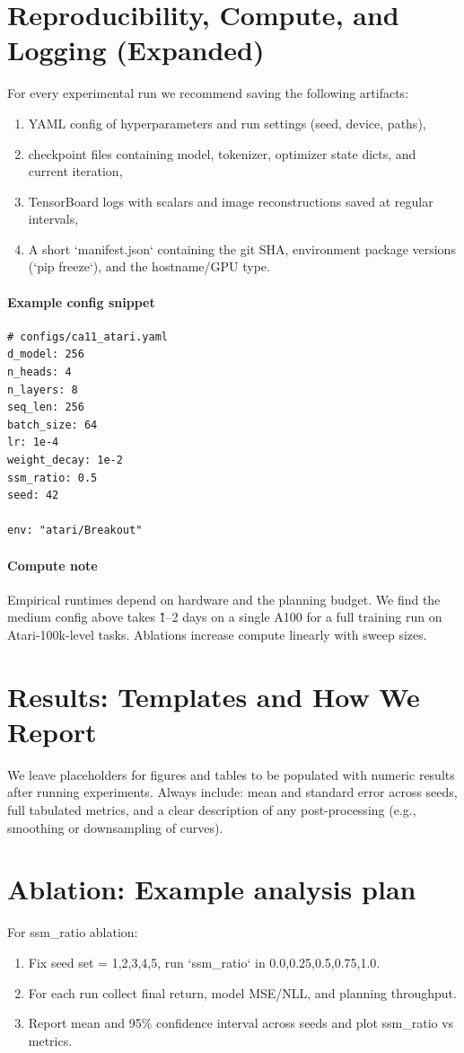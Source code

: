 \documentclass{article}
\begin{document}
\section{Reproducibility, Compute, and Logging (Expanded)}
For every experimental run we recommend saving the following artifacts:
\begin{enumerate}
  \item YAML config of hyperparameters and run settings (seed, device, paths),
  \item checkpoint files containing model, tokenizer, optimizer state dicts, and current iteration,
  \item TensorBoard logs with scalars and image reconstructions saved at regular intervals,
  \item A short `manifest.json` containing the git SHA, environment package versions (`pip freeze`), and the hostname/GPU type.
\end{enumerate}

\paragraph{Example config snippet}
\begin{verbatim}
# configs/ca11_atari.yaml
d_model: 256
n_heads: 4
n_layers: 8
seq_len: 256
batch_size: 64
lr: 1e-4
weight_decay: 1e-2
ssm_ratio: 0.5
seed: 42

env: "atari/Breakout"
\end{verbatim}

\paragraph{Compute note}
Empirical runtimes depend on hardware and the planning budget. We find the medium config above takes \~1–2 days on a single A100 for a full training run on Atari-100k-level tasks. Ablations increase compute linearly with sweep sizes.

\section{Results: Templates and How We Report}
We leave placeholders for figures and tables to be populated with numeric results after running experiments. Always include: mean and standard error across seeds, full tabulated metrics, and a clear description of any post-processing (e.g., smoothing or downsampling of curves).

\section{Ablation: Example analysis plan}
For ssm\_ratio ablation:
\begin{enumerate}
  \item Fix seed set = {1,2,3,4,5}, run `ssm_ratio` in {0.0,0.25,0.5,0.75,1.0}.
  \item For each run collect final return, model MSE/NLL, and planning throughput.
  \item Report mean and 95\% confidence interval across seeds and plot ssm\_ratio vs metrics.
\end{enumerate}
\end{document}
